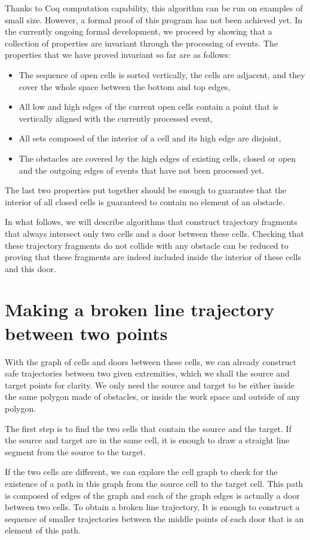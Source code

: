 \documentclass{easychair}
\begin{document}
Thanks to Coq computation capability, this algorithm can be run on
examples of small size.  However, a formal proof of this program has
not been achieved yet.  In the currently ongoing formal development, we
proceed by showing that a collection of properties are invariant
through the processing of events.  The properties that we have proved
invariant so far are as follows:
\begin{itemize}
\item The sequence of open cells is sorted vertically, the cells are
  adjacent, and they cover the whole space between the bottom and top
  edges,
\item All low and high edges of the current open cells contain a point
that is vertically aligned with the currently processed event,
\item All sets composed of the interior of a cell and its high edge
are disjoint,
\item The obstacles are covered by the high edges of existing cells,
  closed or open and the outgoing edges of events that have not been
  processed yet.
\end{itemize}
The last two properties put together should be enough to guarantee
that the interior of all closed cells is guaranteed to contain no
element of an obstacle.

In what follows, we will describe algorithms that
construct trajectory fragments that always
intersect only two cells and a door between these cells.
Checking that these trajectory fragments do not collide with any
obstacle can be reduced to proving that these fragments are indeed
included inside the interior of these cells and this door.
\section{Making a broken line trajectory between two points}
With the graph of cells and doors between these cells, we can already
construct safe trajectories between two given extremities, which we shall
the source and target points for clarity.  We only need the source and
target to be either inside the same polygon made of obstacles, or
inside the work space and outside of any polygon.

The first step is to find the two cells that contain the source and
the target.  If the source and target are in the same cell, it is
enough to draw a straight line segment from the source to the target.

If the two cells are different, we can explore the cell graph to check for
the existence of a path in this graph from the source cell to the
target cell.  This path is composed of edges of the graph and each of
the graph edges is actually a door between two cells.  To obtain a
broken line trajectory, It is enough to
construct a sequence of smaller trajectories between the middle points
of each door that is an element of this path.
\end{document}
